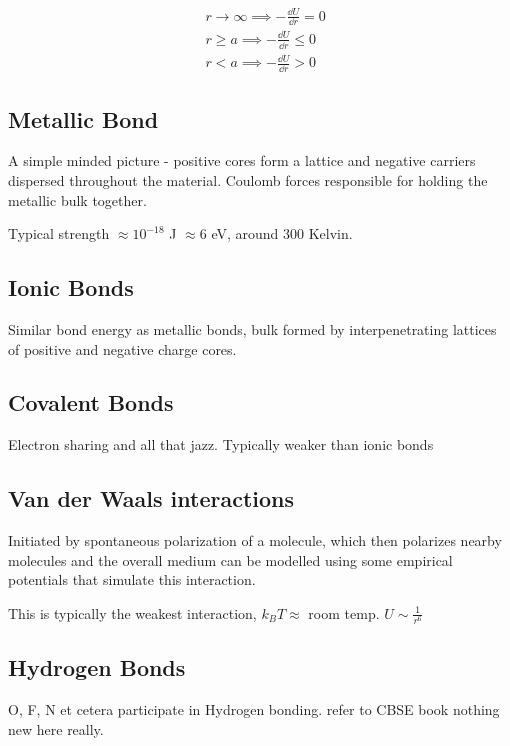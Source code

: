 \documentclass[a4paper]{article}
\begin{document}
\begin{equation}
	\begin{split}
		&r\to \infty \implies -\frac{\dd U}{\dd r} = 0\\
		&r \ge a \implies -\frac{\dd U}{\dd r} \le  0\\
		&r < a \implies -\frac{\dd U}{\dd r} > 0
	\end{split}
\end{equation}

\subsection*{Metallic Bond}
A simple minded picture - positive cores form a lattice and negative
carriers dispersed throughout the material. Coulomb forces responsible
for holding the metallic bulk together. 

Typical strength $\approx 10^{-18}$ J $\approx 6 $ eV, around
300 Kelvin.

\subsection*{Ionic Bonds}
Similar bond energy as metallic bonds, bulk formed by interpenetrating
lattices of positive and negative charge cores.

\subsection*{Covalent Bonds}
Electron sharing and all that jazz. Typically weaker than ionic bonds

\subsection*{Van der Waals interactions}
Initiated by spontaneous polarization of a molecule, which then
polarizes nearby molecules and the overall medium can be modelled
using some empirical potentials that simulate this interaction.

This is typically the weakest interaction,  $k_BT \approx $ room temp. $U\sim \frac{1}{r^{6}}$
 
\subsection*{Hydrogen Bonds}
O, F, N et cetera participate in Hydrogen bonding. refer to CBSE book
nothing new here really.
\end{document}
